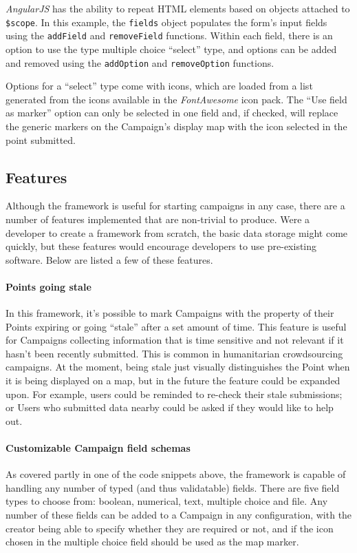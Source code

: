 \documentclass{article}
\begin{document}
	\emph{AngularJS} has the ability to repeat HTML elements based on objects attached to \texttt{\$scope}. In this example, the \texttt{fields} object populates the form's input fields using the \texttt{addField} and \texttt{removeField} functions. Within each field, there is an option to use the type multiple choice ``select'' type, and options can be added and removed using the \texttt{addOption} and \texttt{removeOption} functions.

	Options for a ``select'' type come with icons, which are loaded from a list generated from the icons available in the \emph{FontAwesome} icon pack. The ``Use field as marker'' option can only be selected in one field and, if checked, will replace the generic markers on the Campaign's display map with the icon selected in the point submitted.

	\subsection{Features}

	Although the framework is useful for starting campaigns in any case, there are a number of features implemented that are non-trivial to produce. Were a developer to create a framework from scratch, the basic data storage might come quickly, but these features would encourage developers to use pre-existing software. Below are listed a few of these features.

	\paragraph{Points going stale}
	In this framework, it's possible to mark Campaigns with the property of their Points expiring or going ``stale'' after a set amount of time. This feature is useful for Campaigns collecting information that is time sensitive and not relevant if it hasn't been recently submitted. This is common in humanitarian crowdsourcing campaigns. At the moment, being stale just visually distinguishes the Point when it is being displayed on a map, but in the future the feature could be expanded upon. For example, users could be reminded to re-check their stale submissions; or Users who submitted data nearby could be asked if they would like to help out.

	\paragraph{Customizable Campaign field schemas}
	As covered partly in one of the code snippets above, the framework is capable of handling any number of typed (and thus validatable) fields. There are five field types to choose from: boolean, numerical, text, multiple choice and file. Any number of these fields can be added to a Campaign in any configuration, with the creator being able to specify whether they are required or not, and if the icon chosen in the multiple choice field should be used as the map marker.
\end{document}

